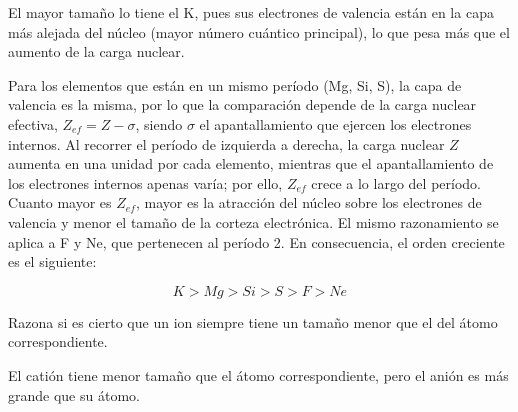 \begin{question}
\begin{solu}
        El mayor tamaño lo tiene el K, pues sus electrones de valencia
        están en la capa más alejada del núcleo (mayor número cuántico
        principal), lo que pesa más que el aumento de la carga nuclear.

        Para los elementos que están en un mismo período (Mg, Si, S), la
        capa de valencia es la misma, por lo que la comparación depende
        de la carga nuclear efectiva, \(Z_{ef} = Z - \sigma\), siendo
        \(\sigma\) el apantallamiento que ejercen los electrones internos.
        Al recorrer el período de izquierda a derecha, la carga nuclear
        \(Z\) aumenta en una unidad por cada elemento, mientras que el
        apantallamiento de los electrones internos apenas varía; por
        ello, \(Z_{ef}\) crece a lo largo del período. Cuanto mayor es
        \(Z_{ef}\), mayor es la atracción del núcleo sobre los electrones
        de valencia y menor el tamaño de la corteza electrónica. El
        mismo razonamiento se aplica a F y Ne, que pertenecen al
        período 2.
        En consecuencia, el orden creciente es el siguiente:

        \[K > Mg > Si > S > F > Ne\]
    \end{solu}
\end{question}

\begin{question}
    Razona si es cierto que un ion siempre tiene un tamaño
    menor que el del átomo correspondiente.

    \begin{solu}
        El catión tiene menor tamaño que el átomo correspondiente,
        pero el anión es más grande que su átomo.
    \end{solu}
\end{question}

